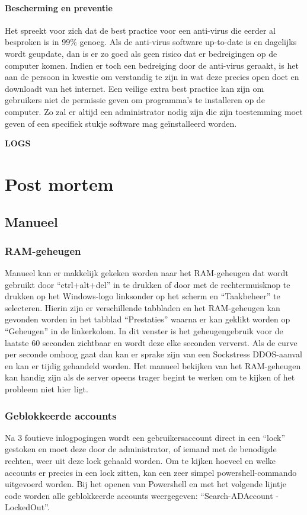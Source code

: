 \documentclass[pdftex,a4paper,12pt]{report}
\begin{document}
\subsubsection{Bescherming en preventie}
Het spreekt voor zich dat de best practice voor een anti-virus die eerder al besproken is in 99\% genoeg. Als de anti-virus software up-to-date is en dagelijks wordt geupdate, dan is er zo goed als geen risico dat er bedreigingen op de computer komen. Indien er toch een bedreiging door de anti-virus geraakt, is het aan de persoon in kwestie om verstandig te zijn in wat deze precies open doet en downloadt van het internet. Een veilige extra best practice kan zijn om gebruikers niet de permissie geven om programma's te installeren op de computer. Zo zal er altijd een administrator nodig zijn die zijn toestemming moet geven of een specifiek stukje software mag geïnstalleerd worden.

\textbf{LOGS}

\chapter{Post mortem}
\section{Manueel}
\subsection{RAM-geheugen}
Manueel kan er makkelijk gekeken worden naar het RAM-geheugen dat wordt gebruikt door "`ctrl+alt+del"' in te drukken of door met de rechtermuisknop te drukken op het Windows-logo linksonder op het scherm en "`Taakbeheer"' te selecteren. Hierin zijn er verschillende tabbladen en het RAM-geheugen kan gevonden worden in het tabblad "`Prestaties"' waarna er kan geklikt worden op "`Geheugen"' in de linkerkolom. In dit venster is het geheugengebruik voor de laatste 60 seconden zichtbaar en wordt deze elke seconden ververst. Als de curve per seconde omhoog gaat dan kan er sprake zijn van een Sockstress DDOS-aanval en kan er tijdig gehandeld worden. Het manueel bekijken van het RAM-geheugen kan handig zijn als de server opeens trager begint te werken om te kijken of het probleem niet hier ligt.

\subsection{Geblokkeerde accounts}
Na 3 foutieve inlogpogingen wordt een gebruikersaccount direct in een "`lock"' gestoken en moet deze door de administrator, of iemand met de benodigde rechten, weer uit deze lock gehaald worden. Om te kijken hoeveel en welke accounts er precies in een lock zitten, kan een zeer simpel powershell-commando uitgevoerd worden. Bij het openen van Powershell en met het volgende lijntje code worden alle geblokkeerde accounts weergegeven: "`Search-ADAccount -LockedOut"'. \newline 
\end{document}
